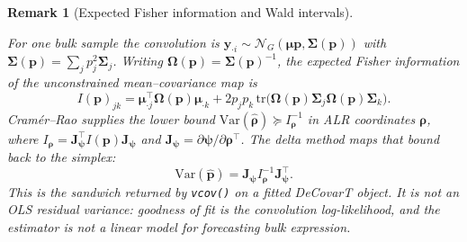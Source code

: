 \documentclass[pdflatex, sn-nature]{sn-jnl}
\theoremstyle{thmstyleone}%
\theoremstyle{thmstyletwo}%
\newtheorem{remark}{Remark}%
\theoremstyle{thmstylethree}%
\begin{document}
\begin{appendices}
        \begin{remark}[Expected Fisher information and Wald intervals]
            \label{pr:decovart-expected-fisher}

            For one bulk sample the convolution is
            \(\boldsymbol{y}_{\cdot i}\sim
            \mathcal{N}_{G}(\boldsymbol{\mu}\boldsymbol{p},
            \boldsymbol{\Sigma}(\boldsymbol{p}))\) with
            \(\boldsymbol{\Sigma}(\boldsymbol{p})=\sum_{j}p_{j}^{2}\boldsymbol{\Sigma}_{j}\).
            Writing
            \(\boldsymbol{\Omega}(\boldsymbol{p})=\boldsymbol{\Sigma}(\boldsymbol{p})^{-1}\),
            the expected Fisher information of the unconstrained
            mean--covariance map is
            \begin{equation}
                \label{eq-expected-fisher-p}
                I(\boldsymbol{p})_{jk}
                =
                \boldsymbol{\mu}_{\cdot j}^{\top}
                \boldsymbol{\Omega}(\boldsymbol{p})
                \boldsymbol{\mu}_{\cdot k}
                +
                2 p_{j} p_{k}\,
                \mathrm{tr}\bigl(
                    \boldsymbol{\Omega}(\boldsymbol{p})
                    \boldsymbol{\Sigma}_{j}
                    \boldsymbol{\Omega}(\boldsymbol{p})
                    \boldsymbol{\Sigma}_{k}
                \bigr).
            \end{equation}
            Cramér--Rao supplies the lower bound
            \(\mathrm{Var}(\hat{\boldsymbol{\rho}})
            \succeq I_{\boldsymbol{\rho}}^{-1}\) in ALR coordinates
            \(\boldsymbol{\rho}\), where
            \(I_{\boldsymbol{\rho}}
            =\mathbf{J}_{\boldsymbol{\psi}}^{\top}
            I(\boldsymbol{p})
            \mathbf{J}_{\boldsymbol{\psi}}\) and
            \(\mathbf{J}_{\boldsymbol{\psi}}
            =\partial\boldsymbol{\psi}/\partial\boldsymbol{\rho}^{\top}\).
            The delta method maps that bound back to the simplex:
            \begin{equation}
                \label{eq-delta-method-p}
                \mathrm{Var}(\hat{\boldsymbol{p}})
                =
                \mathbf{J}_{\boldsymbol{\psi}}
                I_{\boldsymbol{\rho}}^{-1}
                \mathbf{J}_{\boldsymbol{\psi}}^{\top}.
            \end{equation}
            This is the sandwich returned by \texttt{vcov()} on a fitted
            DeCovarT object. It is not an OLS residual variance: goodness of
            fit is the convolution log-likelihood, and the estimator is not a
            linear model for forecasting bulk expression.
        \end{remark}


\end{appendices}
\end{document}
